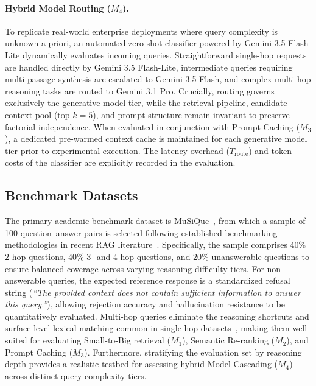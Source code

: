 \paragraph{Hybrid Model Routing ($M_4$).}
To replicate real-world enterprise deployments where query complexity is unknown a priori, an automated zero-shot classifier powered by Gemini 3.5 Flash-Lite dynamically evaluates incoming queries. Straightforward single-hop requests are handled directly by Gemini 3.5 Flash-Lite, intermediate queries requiring multi-passage synthesis are escalated to Gemini 3.5 Flash, and complex multi-hop reasoning tasks are routed to Gemini 3.1 Pro. Crucially, routing governs exclusively the generative model tier, while the retrieval pipeline, candidate context pool ($\text{top-}k = 5$), and prompt structure remain invariant to preserve factorial independence. When evaluated in conjunction with Prompt Caching ($M_3$), a dedicated pre-warmed context cache is maintained for each generative model tier prior to experimental execution. The latency overhead ($T_{\text{route}}$) and token costs of the classifier are explicitly recorded in the evaluation.

\subsection{Benchmark Datasets}
\label{subsec:bench_datasets}

The primary academic benchmark dataset is MuSiQue~\citep{trivedi2022musique}, from which a sample of 100 question--answer pairs is selected following established benchmarking methodologies in recent RAG literature~\citep{lumer2026rethinking, demourajunior2026adaptive}. Specifically, the sample comprises 40\% 2-hop questions, 40\% 3- and 4-hop questions, and 20\% unanswerable questions to ensure balanced coverage across varying reasoning difficulty tiers. For non-answerable queries, the expected reference response is a standardized refusal string (\textit{``The provided context does not contain sufficient information to answer this query.''}), allowing rejection accuracy and hallucination resistance to be quantitatively evaluated. Multi-hop queries eliminate the reasoning shortcuts and surface-level lexical matching common in single-hop datasets~\citep{trivedi2022musique}, making them well-suited for evaluating Small-to-Big retrieval ($M_1$), Semantic Re-ranking ($M_2$), and Prompt Caching ($M_3$). Furthermore, stratifying the evaluation set by reasoning depth provides a realistic testbed for assessing hybrid Model Cascading ($M_4$) across distinct query complexity tiers. 

